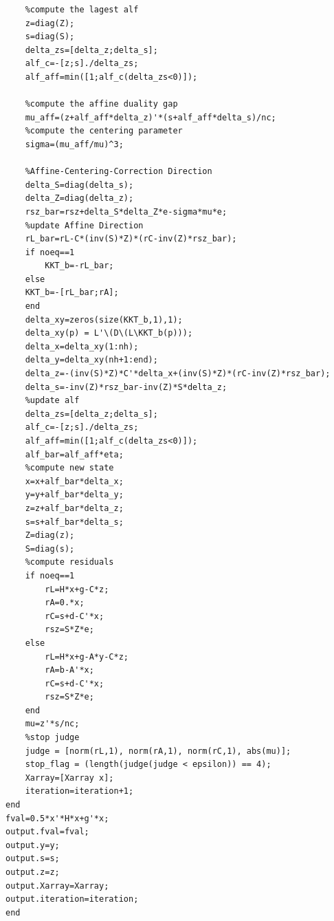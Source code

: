 {\begin{lstlisting}
    %compute the lagest alf
    z=diag(Z);
    s=diag(S);
    delta_zs=[delta_z;delta_s];
    alf_c=-[z;s]./delta_zs;
    alf_aff=min([1;alf_c(delta_zs<0)]);
    
    %compute the affine duality gap
    mu_aff=(z+alf_aff*delta_z)'*(s+alf_aff*delta_s)/nc;
    %compute the centering parameter
    sigma=(mu_aff/mu)^3;
    
    %Affine-Centering-Correction Direction
    delta_S=diag(delta_s);
    delta_Z=diag(delta_z);
    rsz_bar=rsz+delta_S*delta_Z*e-sigma*mu*e;
    %update Affine Direction
    rL_bar=rL-C*(inv(S)*Z)*(rC-inv(Z)*rsz_bar);
    if noeq==1
        KKT_b=-rL_bar;
    else
    KKT_b=-[rL_bar;rA];
    end
    delta_xy=zeros(size(KKT_b,1),1);
    delta_xy(p) = L'\(D\(L\KKT_b(p)));
    delta_x=delta_xy(1:nh);
    delta_y=delta_xy(nh+1:end);
    delta_z=-(inv(S)*Z)*C'*delta_x+(inv(S)*Z)*(rC-inv(Z)*rsz_bar);
    delta_s=-inv(Z)*rsz_bar-inv(Z)*S*delta_z;
    %update alf
    delta_zs=[delta_z;delta_s];
    alf_c=-[z;s]./delta_zs;
    alf_aff=min([1;alf_c(delta_zs<0)]);
    alf_bar=alf_aff*eta;
    %compute new state
    x=x+alf_bar*delta_x;
    y=y+alf_bar*delta_y;
    z=z+alf_bar*delta_z;
    s=s+alf_bar*delta_s;
    Z=diag(z);
    S=diag(s);
    %compute residuals
    if noeq==1
        rL=H*x+g-C*z;
        rA=0.*x;
        rC=s+d-C'*x;
        rsz=S*Z*e;
    else
        rL=H*x+g-A*y-C*z;
        rA=b-A'*x;
        rC=s+d-C'*x;
        rsz=S*Z*e;
    end
    mu=z'*s/nc;
    %stop judge
    judge = [norm(rL,1), norm(rA,1), norm(rC,1), abs(mu)];
    stop_flag = (length(judge(judge < epsilon)) == 4);
    Xarray=[Xarray x];
    iteration=iteration+1;
end
fval=0.5*x'*H*x+g'*x;
output.fval=fval;
output.y=y;
output.s=s;
output.z=z;
output.Xarray=Xarray;
output.iteration=iteration;
end
\end{lstlisting}}

